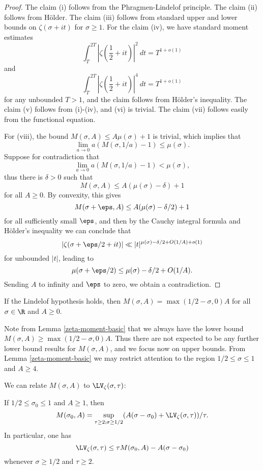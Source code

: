 \begin{proof} The claim (i) follows from the Phragmen-Lindelof principle.  The claim (ii) follows from H\"older.  The claim (iii) follows from standard upper and lower bounds on $\zeta(\sigma+it)$ for $\sigma \geq 1$.  For the claim (iv), we have standard moment estimates
$$ \int_T^{2T} |\zeta(\frac{1}{2}+it)|^2\ dt = T^{1+o(1)}$$
and
$$ \int_T^{2T} |\zeta(\frac{1}{2}+it)|^4\ dt = T^{1+o(1)}$$
for any unbounded $T>1$, and the claim follows from H\"older's inequality.  The claim (v) follows from (i)-(iv), and (vi) is trivial. The claim (vii) follows easily from the functional equation.

For (viii), the bound $M(\sigma,A) \leq A \mu(\sigma) + 1$ is trivial, which implies that
$$ \lim_{a \to 0} a(M(\sigma,1/a)-1) \leq \mu(\sigma).$$
Suppose for contradiction that
$$ \lim_{a \to 0} a(M(\sigma,1/a)-1) < \mu(\sigma),$$
thus there is $\delta>0$ such that
$$M(\sigma,A) \leq A (\mu(\sigma)-\delta) + 1$$
for all $A\geq 0$.  By convexity, this gives
$$M(\sigma+\eps,A) \leq A (\mu(\sigma)-\delta/2) + 1$$
for all sufficiently small $\eps$, and then by the Cauchy integral formula and H\"older's inequality we can conclude that
$$ |\zeta(\sigma+\eps/2 +it)| \ll |t|^{\mu(\sigma)-\delta/2 + O(1/A) + o(1)} $$
for unbounded $|t|$, leading to
$$ \mu(\sigma+\eps/2) \leq \mu(\sigma)-\delta/2 + O(1/A).$$
Sending $A$ to infinity and $\eps$ to zero, we obtain a contradiction.
\end{proof}

\begin{corollary} If the Lindelof hypothesis holds, then $M(\sigma,A) = \max(1/2-\sigma,0) A$ for all $\sigma \in \R$ and $A \geq 0$.
\end{corollary}

Note from Lemma \ref{zeta-moment-basic} that we always have the lower bound $M(\sigma,A) \geq \max(1/2-\sigma,0) A$.  Thus there are not expected to be any further lower bound results for $M(\sigma,A)$, and we focus now on upper bounds.  From Lemma \ref{zeta-moment-basic} we may restrict attention to the region $1/2 \leq \sigma \leq 1$ and $A \geq 4$.

We can relate $M(\sigma,A)$ to $\LV_\zeta(\sigma,\tau)$:

\begin{lemma}\label{mad}  If $1/2 \leq \sigma_0 \leq 1$ and $A \geq 1$, then
\begin{equation}\label{M-form}
 M(\sigma_0,A) = \sup_{\tau \geq 2; \sigma \geq 1/2} (A(\sigma-\sigma_0) + \LV_\zeta(\sigma,\tau))/\tau.
\end{equation}
In particular, one has
$$ \LV_\zeta(\sigma,\tau) \leq \tau M(\sigma_0,A) - A(\sigma-\sigma_0)$$
whenever $\sigma \geq 1/2$ and $\tau \geq 2$.
\end{lemma}

